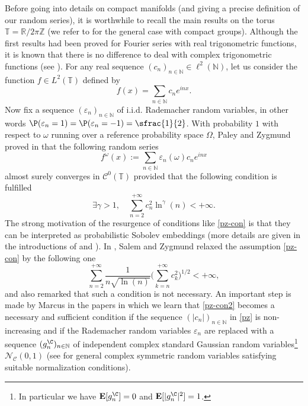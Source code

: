 \documentclass[10pt]{amsart}
\theoremstyle{theorem}
\theoremstyle{definition}
\newcommand\R{\mathbb{R}}
\newcommand\E{\mathbf{E}}
\newcommand\N{\mathbb{N}}
\newcommand\Z{\mathbb{Z}}
\newcommand\CC{\mathcal{C}}
\newcommand\ep{\varepsilon}
\begin{document}
Before going into details on compact manifolds (and giving a precise definition of our random series), it is worthwhile to recall the main results on the torus $\mathbb{T}=\R/ 2\pi \Z$ (we refer to \cite{pisier1981} for the general case with compact groups). Although the first results had been proved for Fourier series with real trigonometric functions, it is known that there is no difference to deal with complex trigonometric functions (see \cite[p.\,122]{pisier1981}). For any real sequence $(c_n)_{n\in \N}\in \ell^2(\N)$, let us consider the function $f\in L^2(\mathbb{T})$ defined by
\begin{equation*}
f(x)=\sum_{n\in \N}c_n e^{inx}.
\end{equation*}
Now fix a sequence $(\varepsilon_n)_{n\in \N}$ of i.i.d. Rademacher random variables, in other words $\P(\varepsilon_n=1)=\P(\varepsilon_n=-1)=\sfrac{1}{2}$.
With probability $1$ with respect to $\omega$ running over a reference probability space $\Omega$, Paley and Zygmund proved in \cite[p.\,347]{paley1930} that the following random series
\begin{equation}\label{pz}
f^\omega(x):=\sum_{n\in \N}\varepsilon_n(\omega) c_n e^{inx}
\end{equation}
almost surely converges in $\CC^0(\mathbb{T})$ provided that the following condition is fulfilled
\begin{equation}\label{pz-con}
\exists \gamma>1, \quad \sum_{n=2}^{+\infty} c_n^2 \ln^{\gamma}(n)<+\infty.
\end{equation}
The strong motivation of the resurgence of conditions like \eqref{pz-con} is that they can be interpreted as probabilistic Sobolev embeddings (more details are given in the introductions of \cite{Tzvetkov4,burq-lebeau} and \cite[p.\,2734]{imek-aif}).
In \cite[p.\,291]{salem1954}, Salem and Zygmund relaxed the assumption \eqref{pz-con} by the following one
\begin{equation}\label{pz-con2}
\sum_{n=2}^{+\infty} \frac{1}{n\sqrt{\ln(n)}}\biggl(\sum_{k=n}^{+\infty}c_k^2 \biggr)^{1/2} <+\infty,
\end{equation}
and also remarked that such a condition is not necessary.
An important step is made by Marcus in the papers \cite{marcus1973,marcus1975} in which we learn that \eqref{pz-con2} becomes a necessary and sufficient condition if the sequence $(|c_n|)_{n\in \N}$ in \eqref{pz} is non-increasing and if the Rademacher random variables $\ep_n$ are replaced with a sequence $(g_n^{\C})_{n\in \N}$ of independent complex standard Gaussian random variables\footnote{In particular we have $\E[g_n^\C]=0$ and $\E[|g_n^\C|^2]=1$.} $\mathcal{N}_\mathcal{C}(0,1)$ (see \cite{marcus1975} for general complex symmetric random variables satisfying suitable normalization conditions).
\end{document}
